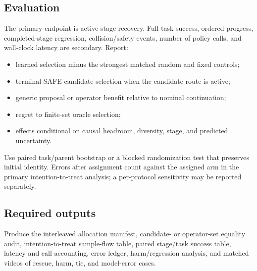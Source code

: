\subsection{Evaluation}

The primary endpoint is active-stage recovery. Full-task success, ordered progress, completed-stage regression, collision/safety events, number of policy calls, and wall-clock latency are secondary. Report:
\begin{itemize}
  \item learned selection minus the strongest matched random and fixed controls;
  \item terminal SAFE candidate selection when the candidate route is active;
  \item generic proposal or operator benefit relative to nominal continuation;
  \item regret to finite-set oracle selection;
  \item effects conditional on causal headroom, diversity, stage, and predicted uncertainty.
\end{itemize}

Use paired task/parent bootstrap or a blocked randomization test that preserves initial identity. Errors after assignment count against the assigned arm in the primary intention-to-treat analysis; a per-protocol sensitivity may be reported separately.



\subsection{Required outputs}

Produce the interleaved allocation manifest, candidate- or operator-set equality audit, intention-to-treat sample-flow table, paired stage/task success table, latency and call accounting, error ledger, harm/regression analysis, and matched videos of rescue, harm, tie, and model-error cases.

